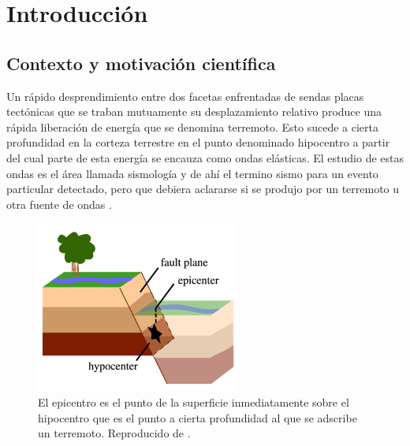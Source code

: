 \documentclass[a4paper]{report}
\begin{document}
\tableofcontents


\chapter{Introducción}

\section{Contexto y motivación científica}\label{sec:contexto}

Un rápido desprendimiento entre dos facetas enfrentadas de sendas placas tectónicas que se traban mutuamente su desplazamiento relativo produce una rápida liberación de energía que se denomina terremoto.
Esto sucede a cierta profundidad en la corteza terrestre en el punto denominado hipocentro a partir del cual parte de esta energía se encauza como ondas elásticas.
El estudio de estas ondas es el área llamada sismología y de ahí el termino sismo para un evento particular detectado, pero que debiera aclararse si se produjo por un terremoto u otra fuente de ondas \cite[sección 4.1.1]{fowler_solid_1990}.

\begin{figure}[!ht]
  \centering
	\includegraphics[width=0.6\textwidth]{eq-ed-fault-labeled.png}
	\caption{El epicentro es el punto de la superficie inmediatamente sobre el hipocentro que es el punto a cierta profundidad al que se adscribe un terremoto.
	Reproducido de \cite{lisa_wald_science_nodate}.
	}
	\label{fig:epicentro_hipocentro}
\end{figure}
\end{document}
